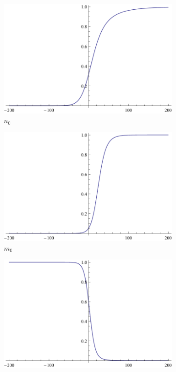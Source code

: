 \documentclass{article}
\numberwithin{equation}{section}
\begin{document}
    \begin{figure}[H]
        \centering
        \begin{subfigure}[t]{0.3\textwidth}
            \includegraphics[width=\textwidth]{./schemas/n0.pdf}
            \caption{$n_0$}
        \end{subfigure}
        \begin{subfigure}[t]{0.3\textwidth}
            \includegraphics[width=\textwidth]{./schemas/m0.pdf}
            \caption{$m_0$}
        \end{subfigure}
        \begin{subfigure}[t]{0.3\textwidth}
            \includegraphics[width=\textwidth]{./schemas/h0.pdf}

\end{subfigure}
\end{figure}
\end{document}

